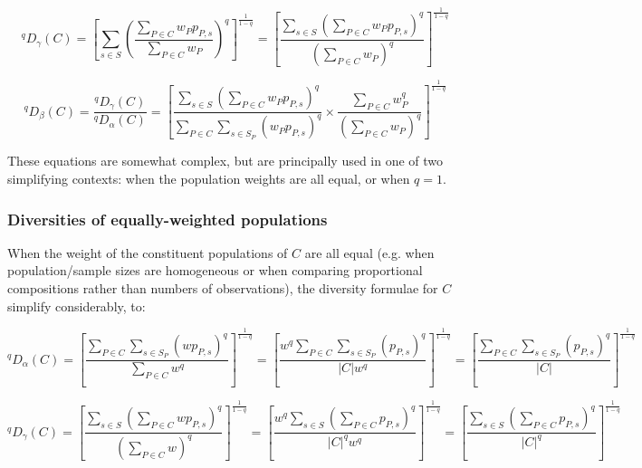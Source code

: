 \begin{equation}
^qD_\gamma(C)
= \left[\sum_{s \in S} \left(\frac{\displaystyle\sum_{P \in C} w_Pp_{P,s}}{\displaystyle\sum_{P \in C} w_P}\right)^q\right]^\frac{1}{1-q}
= \left[\frac{\displaystyle\sum_{s \in S}\left(\sum_{P \in C} w_Pp_{P,s}\right)^q}{\displaystyle\left(\sum_{P \in C} w_P\right)^q}\right]^\frac{1}{1-q}
\label{eq:diversity_gamma}
\end{equation} %

\begin{equation}
^qD_\beta(C) = \frac{^qD_\gamma(C)}{^qD_\alpha(C)}
= \left[
\frac{\displaystyle\sum_{s \in S}\left(\sum_{P \in C} w_Pp_{P,s}\right)^q}
{\displaystyle\sum_{P \in C}\sum_{s \in S_P} (w_Pp_{P,s})^q}
\times
\frac{\displaystyle\sum_{P \in C} w_P^q}
{\displaystyle\left(\sum_{P \in C} w_P\right)^q}
\right]^\frac{1}{1-q}
\label{eq:diversity_beta}
\end{equation} %

These equations are somewhat complex, but are principally used in one of two simplifying contexts: when the population weights are all equal, or when $q = 1$.

\subsubsection{Diversities of equally-weighted populations}

When the weight of the constituent populations of $C$ are all equal (e.g. when population/sample sizes are homogeneous or when comparing proportional compositions rather than numbers of observations), the diversity formulae for $C$ simplify considerably, to:

\begin{equation}
^qD_\alpha(C)
= \left[\frac{\displaystyle\sum_{P \in C}\sum_{s \in S_P} (wp_{P,s})^q}{\displaystyle\sum_{P \in C} w^q}\right]^\frac{1}{1-q}
= \left[\frac{\displaystyle w^q\sum_{P \in C}\sum_{s \in S_P} (p_{P,s})^q}{\displaystyle |C| w^q}\right]^\frac{1}{1-q}
= \left[\frac{\displaystyle \sum_{P \in C}\sum_{s \in S_P} (p_{P,s})^q}{\displaystyle |C|}\right]^\frac{1}{1-q}
\label{eq:diversity_alpha_even}
\end{equation} %

\begin{equation}
^qD_\gamma(C)
= \left[\frac{\displaystyle\sum_{s \in S}\left(\sum_{P \in C} wp_{P,s}\right)^q}{\displaystyle\left(\sum_{P \in C} w\right)^q}\right]^\frac{1}{1-q}
= \left[\frac{\displaystyle w^q\sum_{s \in S}\left(\sum_{P \in C} p_{P,s}\right)^q}{\displaystyle |C|^qw^q}\right]^\frac{1}{1-q}
= \left[\frac{\displaystyle\sum_{s \in S}\left(\sum_{P \in C} p_{P,s}\right)^q}{\displaystyle|C|^q}\right]^\frac{1}{1-q}
\label{eq:diversity_gamma_even}
\end{equation} %

